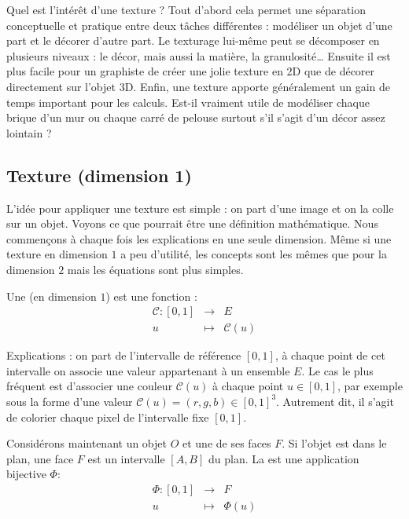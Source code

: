 \documentclass[11pt,class=report,crop=false]{standalone}
\begin{document}
Quel est l'intérêt d'une texture ?
Tout d'abord cela permet une séparation conceptuelle et pratique entre deux tâches différentes : 
modéliser un objet d'une part et le décorer d'autre part. 
Le texturage lui-même peut se décomposer en plusieurs niveaux : le décor, mais aussi la matière, la granulosité\ldots{}
Ensuite il est plus facile pour un graphiste de créer une jolie texture en 2D que de décorer directement sur l'objet 3D. Enfin, une texture apporte généralement un gain de temps important pour les calculs. Est-il vraiment utile de modéliser chaque brique d'un mur ou chaque carré de pelouse surtout s'il s'agit d'un décor assez lointain ?

\subsection{Texture (dimension 1)}


L'idée pour appliquer une texture est simple : on part d'une image et on la colle sur un objet. Voyons ce que pourrait être une définition mathématique.
Nous commençons à chaque fois les explications en une seule dimension. Même si une texture en dimension $1$ a peu d'utilité, les concepts sont les mêmes que pour la dimension $2$ mais les équations sont plus simples.

Une  (en dimension $1$) est une fonction :
$$
	\begin{array}{rcl}
	\mathcal{C} : [0,1] & \longrightarrow & E \\
	 u & \longmapsto & \mathcal{C}(u)
	 \end{array}
$$
	 
Explications : on part de l'intervalle de référence $[0,1]$, à chaque point de cet intervalle on associe une valeur appartenant à un ensemble $E$. 
Le cas le plus fréquent est d'associer une couleur $\mathcal{C}(u)$ à chaque point $u \in [0,1]$, par exemple sous la forme d'une valeur $\mathcal{C}(u) = (r,g,b) \in [0,1]^3$. Autrement dit, il s'agit de colorier chaque pixel de l'intervalle fixe $[0,1]$.




Considérons maintenant un objet $O$ et une de ses faces $F$. Si l'objet est dans le plan, une face $F$ est un intervalle $[A,B]$ du plan.
La  est une application bijective $\Phi$:
$$  \begin{array}{rcl}
	\Phi : [0,1] & \longrightarrow & F \\
	u & \longmapsto & \Phi(u)
\end{array}
$$ 
	
\end{document}
